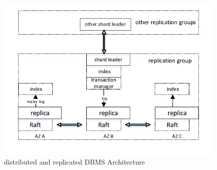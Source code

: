 \documentclass[conference]{IEEEtran}
\begin{document}
\begin{figure}[htbp]
  \centerline{\includegraphics[scale=0.8]{figure/architecture.pdf}}
  \caption{distributed and replicated DBMS Architecture}
  \label{fig:architecture}
\end{figure}
\end{document}
